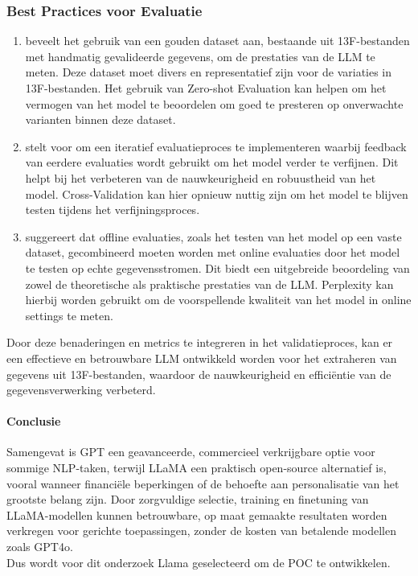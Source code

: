 \subsubsection{Best Practices voor Evaluatie}

\begin{enumerate}
    \item \textcite{Huang2024} beveelt het gebruik van een gouden dataset aan, bestaande uit 13F-bestanden met handmatig gevalideerde gegevens, om de prestaties van de LLM te meten. Deze dataset moet divers en representatief zijn voor de variaties in 13F-bestanden. Het gebruik van Zero-shot Evaluation kan helpen om het vermogen van het model te beoordelen om goed te presteren op onverwachte varianten binnen deze dataset.
    \item \textcite{Islam2024} stelt voor om een iteratief evaluatieproces te implementeren waarbij feedback van eerdere evaluaties wordt gebruikt om het model verder te verfijnen. Dit helpt bij het verbeteren van de nauwkeurigheid en robuustheid van het model. Cross-Validation kan hier opnieuw nuttig zijn om het model te blijven testen tijdens het verfijningsproces.
    \item \textcite{Islam2024} suggereert dat offline evaluaties, zoals het testen van het model op een vaste dataset, gecombineerd moeten worden met online evaluaties door het model te testen op echte gegevensstromen. Dit biedt een uitgebreide beoordeling van zowel de theoretische als praktische prestaties van de LLM. Perplexity kan hierbij worden gebruikt om de voorspellende kwaliteit van het model in online settings te meten.
\end{enumerate}
Door deze benaderingen en metrics te integreren in het validatieproces, kan er een effectieve en betrouwbare LLM ontwikkeld worden voor het extraheren van gegevens uit 13F-bestanden, waardoor de nauwkeurigheid en efficiëntie van de gegevensverwerking verbeterd.




\paragraph{Conclusie}

Samengevat is GPT een geavanceerde, commercieel verkrijgbare optie voor sommige NLP-taken, terwijl LLaMA een praktisch open-source alternatief is, vooral wanneer financiële beperkingen of de behoefte aan personalisatie van het grootste belang zijn. Door zorgvuldige selectie, training en finetuning van LLaMA-modellen kunnen betrouwbare, op maat gemaakte resultaten worden verkregen voor gerichte toepassingen, zonder de kosten van betalende modellen zoals GPT4o.\\
Dus wordt voor dit onderzoek Llama geselecteerd om de POC te ontwikkelen.

